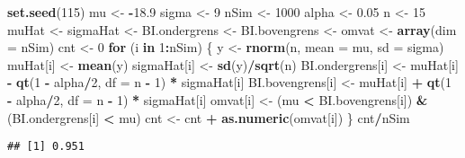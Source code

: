 \documentclass[12pt,dutch,coursenotes]{book}
\newenvironment{Shaded}{\begin{snugshade}}{\end{snugshade}}
\newcommand{\KeywordTok}[1]{\textcolor[rgb]{0.13,0.29,0.53}{\textbf{#1}}}
\newcommand{\DataTypeTok}[1]{\textcolor[rgb]{0.13,0.29,0.53}{#1}}
\newcommand{\DecValTok}[1]{\textcolor[rgb]{0.00,0.00,0.81}{#1}}
\newcommand{\FloatTok}[1]{\textcolor[rgb]{0.00,0.00,0.81}{#1}}
\newcommand{\StringTok}[1]{\textcolor[rgb]{0.31,0.60,0.02}{#1}}
\newcommand{\ControlFlowTok}[1]{\textcolor[rgb]{0.13,0.29,0.53}{\textbf{#1}}}
\newcommand{\OperatorTok}[1]{\textcolor[rgb]{0.81,0.36,0.00}{\textbf{#1}}}
\newcommand{\NormalTok}[1]{#1}
\theoremstyle{definition}
\theoremstyle{definition}
\theoremstyle{definition}
\theoremstyle{remark}
\begin{document}
\begin{Shaded}
\begin{Highlighting}[]
\KeywordTok{set.seed}\NormalTok{(}\DecValTok{115}\NormalTok{)}
\NormalTok{mu <-}\StringTok{ }\OperatorTok{-}\FloatTok{18.9}
\NormalTok{sigma <-}\StringTok{ }\DecValTok{9}
\NormalTok{nSim <-}\StringTok{ }\DecValTok{1000}
\NormalTok{alpha <-}\StringTok{ }\FloatTok{0.05}
\NormalTok{n <-}\StringTok{ }\DecValTok{15}
\NormalTok{muHat <-}\StringTok{ }\NormalTok{sigmaHat <-}\StringTok{ }\NormalTok{BI.ondergrens <-}\StringTok{ }\NormalTok{BI.bovengrens <-}\StringTok{ }\NormalTok{omvat <-}\StringTok{ }\KeywordTok{array}\NormalTok{(}\DataTypeTok{dim =}\NormalTok{ nSim)}
\NormalTok{cnt <-}\StringTok{ }\DecValTok{0}
\ControlFlowTok{for}\NormalTok{ (i }\ControlFlowTok{in} \DecValTok{1}\OperatorTok{:}\NormalTok{nSim) \{}
\NormalTok{    y <-}\StringTok{ }\KeywordTok{rnorm}\NormalTok{(n, }\DataTypeTok{mean =}\NormalTok{ mu, }\DataTypeTok{sd =}\NormalTok{ sigma)}
\NormalTok{    muHat[i] <-}\StringTok{ }\KeywordTok{mean}\NormalTok{(y)}
\NormalTok{    sigmaHat[i] <-}\StringTok{ }\KeywordTok{sd}\NormalTok{(y)}\OperatorTok{/}\KeywordTok{sqrt}\NormalTok{(n)}
\NormalTok{    BI.ondergrens[i] <-}\StringTok{ }\NormalTok{muHat[i] }\OperatorTok{-}\StringTok{ }\KeywordTok{qt}\NormalTok{(}\DecValTok{1} \OperatorTok{-}\StringTok{ }\NormalTok{alpha}\OperatorTok{/}\DecValTok{2}\NormalTok{, }
        \DataTypeTok{df =}\NormalTok{ n }\OperatorTok{-}\StringTok{ }\DecValTok{1}\NormalTok{) }\OperatorTok{*}\StringTok{ }\NormalTok{sigmaHat[i]}
\NormalTok{    BI.bovengrens[i] <-}\StringTok{ }\NormalTok{muHat[i] }\OperatorTok{+}\StringTok{ }\KeywordTok{qt}\NormalTok{(}\DecValTok{1} \OperatorTok{-}\StringTok{ }\NormalTok{alpha}\OperatorTok{/}\DecValTok{2}\NormalTok{, }
        \DataTypeTok{df =}\NormalTok{ n }\OperatorTok{-}\StringTok{ }\DecValTok{1}\NormalTok{) }\OperatorTok{*}\StringTok{ }\NormalTok{sigmaHat[i]}
\NormalTok{    omvat[i] <-}\StringTok{ }\NormalTok{(mu }\OperatorTok{<}\StringTok{ }\NormalTok{BI.bovengrens[i]) }\OperatorTok{&}\StringTok{ }\NormalTok{(BI.ondergrens[i] }\OperatorTok{<}\StringTok{ }
\StringTok{        }\NormalTok{mu)}
\NormalTok{    cnt <-}\StringTok{ }\NormalTok{cnt }\OperatorTok{+}\StringTok{ }\KeywordTok{as.numeric}\NormalTok{(omvat[i])}
\NormalTok{\}}
\NormalTok{cnt}\OperatorTok{/}\NormalTok{nSim}
\end{Highlighting}
\end{Shaded}

\begin{verbatim}
## [1] 0.951
\end{verbatim}
\end{document}
